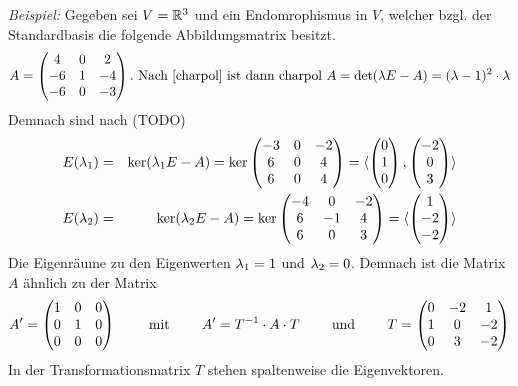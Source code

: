 \textit{Beispiel:}
    Gegeben sei $V=\mathbb{R}^3$ und ein Endomrophismus in $V$, welcher bzgl. der Standardbasis die folgende Abbildungsmatrix besitzt.
    \begin{equation*}
        A=\left(\begin{matrix}4&0&2\\-6&1&-4\\-6&0&-3\end{matrix}\right). \mbox{ Nach \ref{charpol} ist dann charpol }A=\det(\lambda E-A)=(\lambda-1)^2\cdot \lambda 
    \end{equation*}
    Demnach sind nach (TODO)%
    \begin{eqnarray*}
        E(\lambda_1)&=&\ker(\lambda_1 E-A)=\ker\left(\begin{matrix}-3&0&-2\\6&0&4\\6&0&4\end{matrix}\right)=\langle \left(\begin{matrix}0\\1\\0\end{matrix}\right),\left(\begin{matrix}-2\\0\\3\end{matrix}\right) \rangle \\
        E(\lambda_2)&=&\ker(\lambda_2 E-A)=\ker\left(\begin{matrix}-4&0&-2\\6&-1&4\\6&0&3\end{matrix}\right) =\langle \left(\begin{matrix}1\\-2\\-2\end{matrix}\right) \rangle
    \end{eqnarray*}
    Die Eigenräume zu den Eigenwerten $\lambda_1=1$ und $\lambda_2=0$. Demnach ist die Matrix $A$ ähnlich zu der Matrix
    \begin{equation*}
        A'=\left(\begin{matrix}1&0&0\\0&1&0\\0&0&0\end{matrix}\right) \qquad \mbox{ mit }\qquad A'=T^{-1}\cdot A\cdot T\qquad \mbox{ und }\qquad T=\left(\begin{matrix}0&-2&1\\1&0&-2\\0&3&-2\end{matrix}\right)
    \end{equation*}
    In der Transformationsmatrix $T$ stehen spaltenweise die Eigenvektoren.


